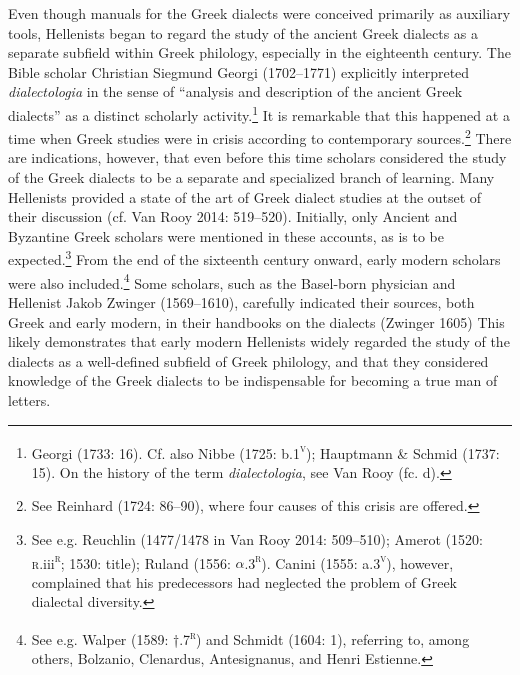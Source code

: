 \begin{styleStandard}
Even though manuals for the Greek dialects were conceived primarily as auxiliary tools, Hellenists began to regard the study of the ancient Greek dialects as a separate subfield within Greek philology, especially in the eighteenth century. The Bible scholar Christian Siegmund Georgi (1702–1771) explicitly interpreted \textit{dialectologia} in the sense of “analysis and description of the ancient Greek dialects” as a distinct scholarly activity.\footnote{ Georgi (1733: 16). Cf. also Nibbe (1725: b.1\textsc{\textsuperscript{v}}); Hauptmann \& Schmid (1737: 15). On the history of the term \textit{dialectologia}, see Van Rooy (fc. d).} It is remarkable that this happened at a time when Greek studies were in crisis according to contemporary sources.\footnote{ See Reinhard (1724: 86–90), where four causes of this crisis are offered.} There are indications, however, that even before this time scholars considered the study of the Greek dialects to be a separate and specialized branch of learning. Many Hellenists provided a state of the art of Greek dialect studies at the outset of their discussion (cf. Van Rooy 2014: 519–520). Initially, only Ancient and Byzantine Greek scholars were mentioned in these accounts, as is to be expected.\footnote{ See e.g. Reuchlin (1477/1478 in Van Rooy 2014: 509–510); Amerot (1520: \textsc{r.}iii\textsc{\textsuperscript{r}}\textsc{; 1530: }title); Ruland (1556: $\alpha $.3\textsc{\textsuperscript{r}}). Canini (1555: a.3\textsc{\textsuperscript{v}}), however, complained that his predecessors had neglected the problem of Greek dialectal diversity.} From the end of the sixteenth century onward, early modern scholars were also included.\footnote{ See e.g. Walper (1589: †.7\textsc{\textsuperscript{r}}) and Schmidt (1604: 1), referring to, among others, Bolzanio, Clenardus, Antesignanus, and Henri Estienne.} Some scholars, such as the Basel-born physician and Hellenist Jakob Zwinger (1569–1610), carefully indicated their sources, both Greek and early modern, in their handbooks on the dialects (Zwinger 1605) This likely demonstrates that early modern Hellenists widely regarded the study of the dialects as a well-defined subfield of Greek philology, and that they considered knowledge of the Greek dialects to be indispensable for becoming a true man of letters.
\end{styleStandard}

